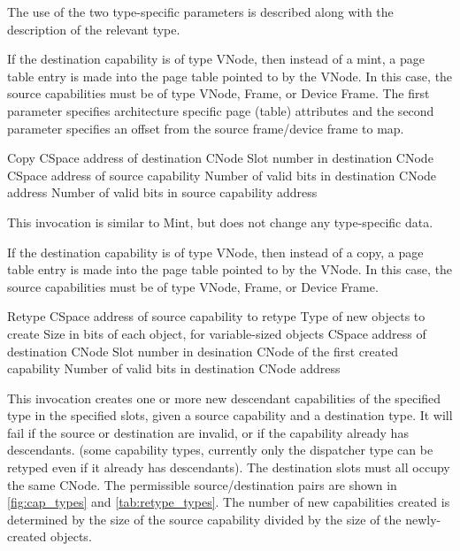 The use of the two type-specific parameters is described along with
the description of the relevant type.

If the destination capability is of type VNode, then instead of a
mint, a page table entry is made into the page table pointed to by the
VNode.  In this case, the source capabilities must be of type VNode,
Frame, or Device Frame.  The first parameter specifies architecture
specific page (table) attributes and the second parameter specifies an
offset from the source frame/device frame to map.
  
\begin{invocation}{Copy}
  \arg CSpace address of destination CNode
  \arg Slot number in destination CNode
  \arg CSpace address of source capability
  \arg Number of valid bits in destination CNode address
  \arg Number of valid bits in source capability address
\end{invocation}
This invocation is similar to Mint, but does not change any
type-specific data.

If the destination capability is of type VNode, then instead of a
copy, a page table entry is made into the page table pointed to by the
VNode.  In this case, the source capabilities must be of type VNode,
Frame, or Device Frame.

\begin{invocation}{Retype}
  \arg CSpace address of source capability to retype
  \arg Type of new objects to create
  \arg Size in bits of each object, for variable-sized objects
  \arg CSpace address of destination CNode
  \arg Slot number in desination CNode of the first created capability
  \arg Number of valid bits in destination CNode address
\end{invocation}

This invocation creates one or more new descendant capabilities of the
specified type in the specified slots, given a source capability and a
destination type.  It will fail if the source or destination are
invalid, or if the capability already has descendants. (some
capability types, currently only the dispatcher type can be retyped
even if it already has descendants).  The destination slots must all
occupy the same CNode.  The permissible source/destination pairs are
shown in \ref{fig:cap_types} and \ref{tab:retype_types}.  The number
of new capabilities created is determined by the size of the source
capability divided by the size of the newly-created objects.


